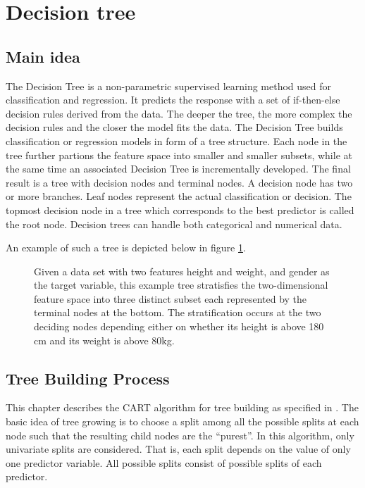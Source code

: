 \section{Decision tree}

\subsection{Main idea}
The Decision Tree is a non-parametric supervised learning method used for classification and regression.
It predicts the response with a set of if-then-else decision rules derived from the data.
The deeper the tree, the more complex the decision rules and the closer the model fits the data.
The Decision Tree builds classification or regression models in form of a tree structure.
Each node in the tree further partions the feature space into smaller and smaller subsets, 
while at the same time an associated Decision Tree is incrementally developed.
The final result is a tree with decision nodes and terminal nodes. 
A decision node has two or more branches.
Leaf nodes represent the actual classification or decision. 
The topmost decision node in a tree which corresponds to the best predictor is called the root node.
Decision trees can handle both categorical and numerical data.

An example of such a tree is depicted below in figure \ref{fig:decision_tree_example}.

\begin{figure}[H]
    \captionsetup{format=plain}
    \caption{Given a data set with two features height and weight, and gender as the target variable, 
             this example tree stratisfies the two-dimensional feature space into three distinct subset each 
             represented by the terminal nodes at the bottom.
             The stratification occurs at the two deciding nodes depending either on whether its height is above 180 cm 
             and its weight is above 80kg.
             }
    \label{fig:decision_tree_example}
\end{figure}

\subsection{Tree Building Process}
This chapter describes the CART algorithm for tree building as specified in \cite{breiman1984classification}.
The basic idea of tree growing is to choose a split among all the possible splits at each node
such that the resulting child nodes are the “purest”. In this algorithm, only univariate splits are
considered. That is, each split depends on the value of only one predictor variable. All
possible splits consist of possible splits of each predictor.

